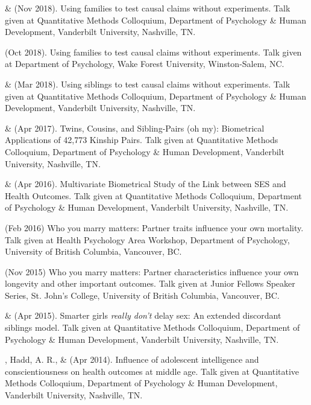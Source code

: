 \item\meb \& \Joe (Nov 2018). Using families to test causal claims without experiments. Talk given at Quantitative Methods Colloquium, Department of Psychology \& Human Development, Vanderbilt University, Nashville, TN. 
\item\meb (Oct 2018). Using families to test causal claims without experiments. Talk given at Department of Psychology, Wake Forest University, Winston-Salem, NC. 
\item\meb \& \Joe (Mar 2018). Using siblings to test causal claims without experiments. Talk given at Quantitative Methods Colloquium, Department of Psychology \& Human Development, Vanderbilt University, Nashville, TN. 
\item\meb \& \Joe (Apr 2017). Twins, Cousins, and Sibling-Pairs (oh my): Biometrical Applications of 42,773 Kinship Pairs. Talk given at Quantitative Methods Colloquium, Department of Psychology \& Human Development, Vanderbilt University, Nashville, TN. \href{https://osf.io/uyqwd/}{\color{blue}{https://osf.io/uyqwd/}}
\item\meb \& \Joe (Apr 2016). Multivariate Biometrical Study of the Link between SES and Health Outcomes. Talk given at Quantitative Methods Colloquium, Department of Psychology \& Human Development, Vanderbilt University, Nashville, TN.
\item \meb (Feb 2016) Who you marry matters: Partner traits influence your own mortality. Talk given at Health Psychology Area Workshop, Department of Psychology, University of British Columbia, Vancouver, BC. \href{https://osf.io/jbf96/}{\color{blue}{https://osf.io/jbf96/}}
\item \meb (Nov 2015) Who you marry matters: Partner characteristics influence your own longevity and other important outcomes. Talk given at Junior Fellows Speaker Series, St. John's College, University of British Columbia, Vancouver, BC. \href{https://osf.io/zqv5t/}{\color{blue}{https://osf.io/zqv5t/}}
\item\meb \& \Joe (Apr 2015). Smarter girls \textit{really don't} delay sex: An extended discordant siblings model. Talk given at Quantitative Methods Colloquium, Department of Psychology \& Human Development, Vanderbilt University, Nashville, TN.
\item\meb, Hadd, A. R., \& \Joe (Apr 2014). Influence of adolescent intelligence and conscientiousness on health outcomes at middle age. Talk given at Quantitative Methods Colloquium, Department of Psychology \& Human Development, Vanderbilt University, Nashville, TN. 

